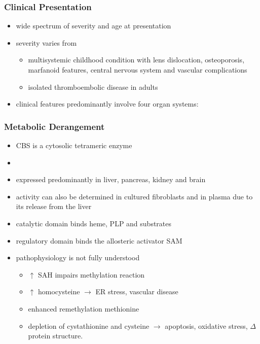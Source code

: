 \documentclass{scrartcl}
\begin{document}
\subsubsection{Clinical Presentation}
\label{sec:org33a434b}
\begin{itemize}
\item wide spectrum of severity and age at presentation
\item severity varies from
\begin{itemize}
\item multisystemic childhood condition with lens dislocation,
osteoporosis, marfanoid features, central nervous system and
vascular complications
\item isolated thromboembolic disease in adults
\end{itemize}
\item clinical features predominantly involve four organ systems:
\end{itemize}
\subsubsection{Metabolic Derangement}
\label{sec:org34a4f91}
\begin{itemize}
\item CBS is a cytosolic tetrameric enzyme
\item {}
\item expressed predominantly in liver, pancreas, kidney and brain
\item activity can also be determined in cultured fibroblasts and in plasma
due to its release from the liver
\item catalytic domain binds heme, PLP and substrates
\item regulatory domain binds the allosteric activator SAM
\item pathophysiology is not fully understood
\begin{itemize}
\item \(\uparrow\) SAH impairs methylation reaction
\item \(\uparrow\) homocysteine \(\to\) ER stress, vascular disease
\item enhanced remethylation methionine
\item depletion of cystathionine and cysteine \(\to\) apoptosis, oxidative
stress, \(\Delta\) protein structure.
\end{itemize}
\end{itemize}
\end{document}
